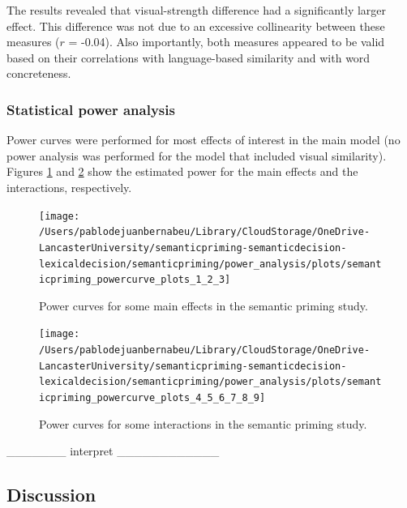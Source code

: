 \documentclass[
  12pt,
  man,floatsintext]{apa7}
\begin{document}
The results revealed that visual-strength difference had a significantly larger effect. This difference was not due to an excessive collinearity between these measures (\(r\) = -0.04). Also importantly, both measures appeared to be valid based on their correlations with language-based similarity and with word concreteness.

\hypertarget{statistical-power-analysis}{%
\subsubsection{Statistical power analysis}\label{statistical-power-analysis}}

Power curves were performed for most effects of interest in the main model (no power analysis was performed for the model that included visual similarity). Figures \ref{fig:semanticpriming-powercurve-plots-1-2-3} and \ref{fig:semanticpriming-powercurve-plots-4-5-6-7-8-9} show the estimated power for the main effects and the interactions, respectively.

\begin{figure}

{\centering \texttt{[image: /Users/pablodejuanbernabeu/Library/CloudStorage/OneDrive-LancasterUniversity/semanticpriming-semanticdecision-lexicaldecision/semanticpriming/power\_analysis/plots/semanticpriming\_powercurve\_plots\_1\_2\_3]} 

}

\caption{Power curves for some main effects in the semantic priming study.}\label{fig:semanticpriming-powercurve-plots-1-2-3}
\end{figure}

\begin{figure}

{\centering \texttt{[image: /Users/pablodejuanbernabeu/Library/CloudStorage/OneDrive-LancasterUniversity/semanticpriming-semanticdecision-lexicaldecision/semanticpriming/power\_analysis/plots/semanticpriming\_powercurve\_plots\_4\_5\_6\_7\_8\_9]} 

}

\caption{Power curves for some interactions in the semantic priming study.}\label{fig:semanticpriming-powercurve-plots-4-5-6-7-8-9}
\end{figure}

\_\_\_\_\_\_\_ interpret \_\_\_\_\_\_\_\_\_\_\_\_

\hypertarget{discussion}{%
\subsection{Discussion}\label{discussion}}
\end{document}
